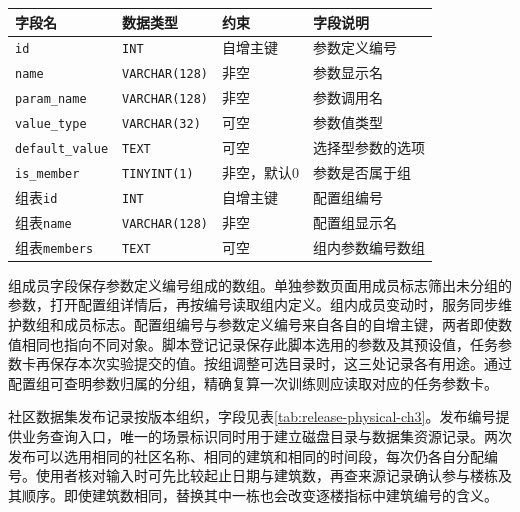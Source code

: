 \begin{table}[!htbp]
    \centering\small
    \label{tab:param-physical-ch3}
    \begin{tabular}{@{}P{8em}P{7em}P{6.5em}P{8em}@{}}
        \toprule
        字段名                     & 数据类型                  & 约束     & 字段说明     \\ \midrule
        \texttt{id}             & \texttt{INT}          & 自增主键   & 参数定义编号   \\
        \texttt{name}           & \texttt{VARCHAR(128)} & 非空     & 参数显示名    \\
        \texttt{param\_name}    & \texttt{VARCHAR(128)} & 非空     & 参数调用名    \\
        \texttt{value\_type}    & \texttt{VARCHAR(32)}  & 可空     & 参数值类型    \\
        \texttt{default\_value} & \texttt{TEXT}         & 可空     & 选择型参数的选项 \\
        \texttt{is\_member}     & \texttt{TINYINT(1)}   & 非空，默认0 & 参数是否属于组  \\
        组表\texttt{id}           & \texttt{INT}          & 自增主键   & 配置组编号    \\
        组表\texttt{name}         & \texttt{VARCHAR(128)} & 非空     & 配置组显示名   \\
        组表\texttt{members}      & \texttt{TEXT}         & 可空     & 组内参数编号数组 \\
        \bottomrule
    \end{tabular}
\end{table}

组成员字段保存参数定义编号组成的数组。单独参数页面用成员标志筛出未分组的参数，打开配置组详情后，再按编号读取组内定义。组内成员变动时，服务同步维护数组和成员标志。配置组编号与参数定义编号来自各自的自增主键，两者即使数值相同也指向不同对象。脚本登记记录保存此脚本选用的参数及其预设值，任务参数卡再保存本次实验提交的值。按组调整可选目录时，这三处记录各有用途。通过配置组可查明参数归属的分组，精确复算一次训练则应读取对应的任务参数卡。

社区数据集发布记录按版本组织，字段见表\ref{tab:release-physical-ch3}。发布编号提供业务查询入口，唯一的场景标识同时用于建立磁盘目录与数据集资源记录。两次发布可以选用相同的社区名称、相同的建筑和相同的时间段，每次仍各自分配编号。使用者核对输入时可先比较起止日期与建筑数，再查来源记录确认参与楼栋及其顺序。即使建筑数相同，替换其中一栋也会改变逐楼指标中建筑编号的含义。

